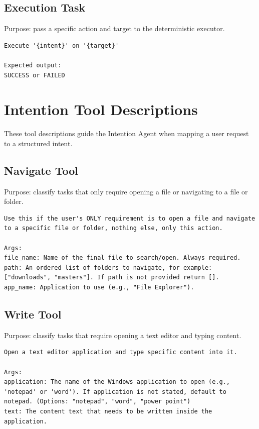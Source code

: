 \subsection{Execution Task}

Purpose: pass a specific action and target to the deterministic executor.

\begin{lstlisting}
Execute '{intent}' on '{target}'

Expected output:
SUCCESS or FAILED
\end{lstlisting}

\section{Intention Tool Descriptions}

These tool descriptions guide the Intention Agent when mapping a user request to a structured intent.

\subsection{Navigate Tool}

Purpose: classify tasks that only require opening a file or navigating to a file or folder.

\begin{lstlisting}
Use this if the user's ONLY requirement is to open a file and navigate to a specific file or folder, nothing else, only this action.

Args:
file_name: Name of the final file to search/open. Always required.
path: An ordered list of folders to navigate, for example: ["downloads", "masters"]. If path is not provided return [].
app_name: Application to use (e.g., "File Explorer").
\end{lstlisting}

\subsection{Write Tool}

Purpose: classify tasks that require opening a text editor and typing content.

\begin{lstlisting}
Open a text editor application and type specific content into it.

Args:
application: The name of the Windows application to open (e.g., 'notepad' or 'word'). If application is not stated, default to notepad. (Options: "notepad", "word", "power point")
text: The content text that needs to be written inside the application.
\end{lstlisting}

